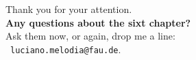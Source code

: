 \documentclass[aspectratio=169,t,table]{beamer}
\begin{document}
  { %
    \begin{frame}[c]
      \begin{center}
        Thank you for your attention.\\
        {\bf Any questions about the sixt chapter?}\\[0.5cm]
        Ask them now, or again, drop me a line: \\
        \faSendO \ \texttt{luciano.melodia@fau.de}.
      \end{center}
    \end{frame}
  }
\end{document}
